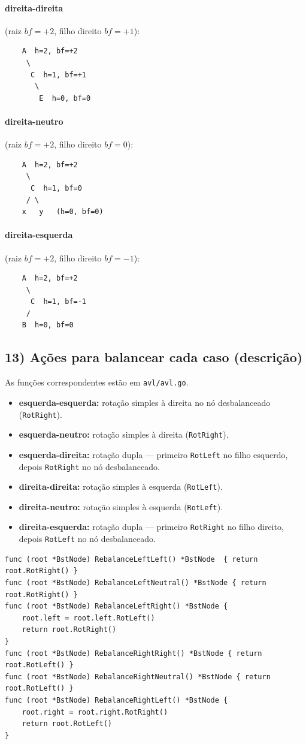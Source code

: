 \documentclass[11pt,a4paper]{article}
\begin{document}
\paragraph{direita-direita} (raiz $bf=+2$, filho direito $bf=+1$):
\begin{Verbatim}
    A  h=2, bf=+2
     \
      C  h=1, bf=+1
       \
        E  h=0, bf=0
\end{Verbatim}

\paragraph{direita-neutro} (raiz $bf=+2$, filho direito $bf=0$):
\begin{Verbatim}
    A  h=2, bf=+2
     \
      C  h=1, bf=0
     / \
    x   y   (h=0, bf=0)
\end{Verbatim}

\paragraph{direita-esquerda} (raiz $bf=+2$, filho direito $bf=-1$):
\begin{Verbatim}
    A  h=2, bf=+2
     \
      C  h=1, bf=-1
     /
    B  h=0, bf=0
\end{Verbatim}

\subsection*{13) Ações para balancear cada caso (descrição)}
As funções correspondentes estão em \texttt{avl/avl.go}.
\begin{itemize}[noitemsep]
  \item \textbf{esquerda-esquerda:} rotação simples à direita no nó desbalanceado
        (\texttt{RotRight}).
  \item \textbf{esquerda-neutro:} rotação simples à direita (\texttt{RotRight}).
  \item \textbf{esquerda-direita:} rotação dupla --- primeiro \texttt{RotLeft} no filho
        esquerdo, depois \texttt{RotRight} no nó desbalanceado.
  \item \textbf{direita-direita:} rotação simples à esquerda (\texttt{RotLeft}).
  \item \textbf{direita-neutro:} rotação simples à esquerda (\texttt{RotLeft}).
  \item \textbf{direita-esquerda:} rotação dupla --- primeiro \texttt{RotRight} no filho
        direito, depois \texttt{RotLeft} no nó desbalanceado.
\end{itemize}
\begin{lstlisting}
func (root *BstNode) RebalanceLeftLeft() *BstNode  { return root.RotRight() }
func (root *BstNode) RebalanceLeftNeutral() *BstNode { return root.RotRight() }
func (root *BstNode) RebalanceLeftRight() *BstNode {
    root.left = root.left.RotLeft()
    return root.RotRight()
}
func (root *BstNode) RebalanceRightRight() *BstNode { return root.RotLeft() }
func (root *BstNode) RebalanceRightNeutral() *BstNode { return root.RotLeft() }
func (root *BstNode) RebalanceRightLeft() *BstNode {
    root.right = root.right.RotRight()
    return root.RotLeft()
}
\end{lstlisting}
\end{document}
